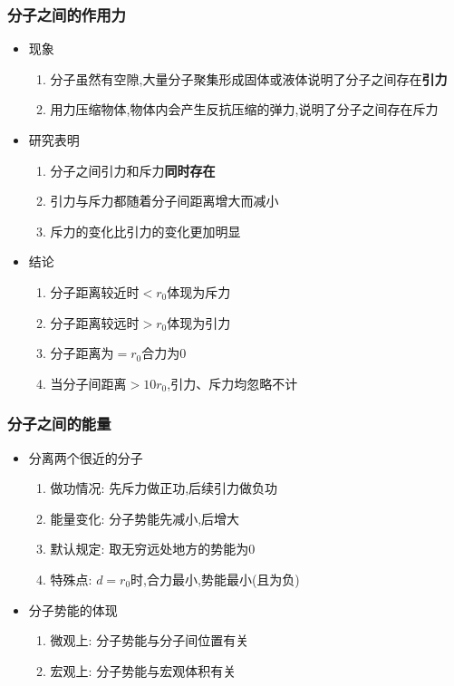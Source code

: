 \documentclass{article}
\begin{document}
\subsubsection{分子之间的作用力}
\begin{itemize}
    \item 现象
          \begin{enumerate}[label = (\arabic*)]
              \item 分子虽然有空隙,大量分子聚集形成固体或液体说明了分子之间存在\textbf{引力}
              \item 用力压缩物体,物体内会产生反抗压缩的弹力,说明了分子之间存在斥力
          \end{enumerate}
    \item 研究表明
          \begin{enumerate}[label = (\arabic*)]
              \item 分子之间引力和斥力\textbf{同时存在}
              \item 引力与斥力都随着分子间距离增大而减小
              \item 斥力的变化比引力的变化更加明显
          \end{enumerate}
    \item 结论
          \begin{enumerate}[label = (\arabic*)]
              \item 分子距离较近时$<r_{0}$体现为斥力
              \item 分子距离较远时$>r_{0}$体现为引力
              \item 分子距离为$=r_{0}$合力为$0$
              \item 当分子间距离$>10r_{0}$,引力、斥力均忽略不计
          \end{enumerate}

\end{itemize}

\vspace{2em}

\subsubsection{分子之间的能量}
\begin{itemize}
    \item 分离两个很近的分子
          \begin{enumerate}[label = (\arabic*)]
              \item 做功情况: 先斥力做正功,后续引力做负功
              \item 能量变化: 分子势能先减小,后增大
              \item 默认规定: 取无穷远处地方的势能为$0$
              \item 特殊点: $d = r_{0}$时,合力最小,势能最小(且为负)
          \end{enumerate}
    \item 分子势能的体现
          \begin{enumerate}[label = (\arabic*)]
              \item 微观上: 分子势能与分子间位置有关
              \item 宏观上: 分子势能与宏观体积有关
          \end{enumerate}
\end{itemize}
\end{document}

